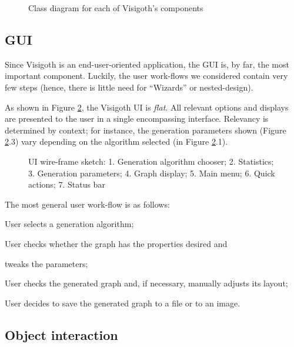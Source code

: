 \documentclass[a4paper,11pt,titlepage]{article}
\begin{document}
\begin{figure}[ht!]
  \centering
  
  \caption{Class diagram for each of Visigoth's components}
  \label{fig:classes}
\end{figure}

\subsection{GUI}
\label{gui}

Since Visigoth is an end-user-oriented application, the GUI is, by
far, the most important component. Luckily, the user work-flows we
considered contain very few steps (hence, there is little need for
``Wizards'' or nested-design).

As shown in Figure \ref{fig:gui-sketch}, the Visigoth UI is
\emph{flat}. All relevant options and displays are presented to the
user in a single encompassing interface. Relevancy is determined by
context; for instance, the generation parameters shown (Figure
\ref{fig:gui-sketch}.3) vary depending on the algorithm selected (in
Figure \ref{fig:gui-sketch}.1).

\begin{figure}[ht!]
  \centering
  
  \caption{UI wire-frame sketch: 1. Generation algorithm chooser;
    2. Statistics; 3. Generation parameters; 4. Graph display; 5. Main
    menu; 6. Quick actions; 7. Status bar}
  \label{fig:gui-sketch}
\end{figure}

\noindent The most general user work-flow is as follows:
\begin{description}
  \setlength{\itemindent}{\parindent}
  \item [Figure \ref{fig:gui-sketch}.1] User selects a generation
    algorithm;
  \item [Figure \ref{fig:gui-sketch}.2] User checks whether the graph
    has the properties desired and
  \item [Figure \ref{fig:gui-sketch}.3] tweaks the parameters;
  \item [Figure \ref{fig:gui-sketch}.4] User checks the generated
    graph and, if necessary, manually adjusts its layout;
  \item [Figure \ref{fig:gui-sketch}.5, 6] User decides to save the
    generated graph to a file or to an image.
\end{description}

\subsection{Object interaction}
\label{interaction}
\end{document}
